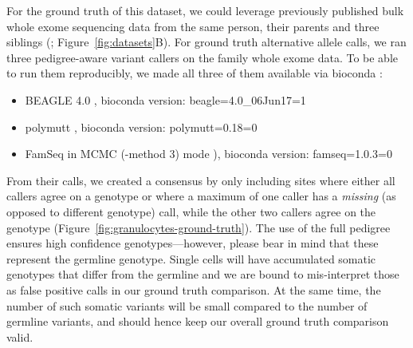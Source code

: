 \documentclass[authoryear,preprint,11pt]{scrartcl}
\begin{document}
For the ground truth of this dataset, we could leverage previously published bulk whole exome sequencing data from the same person, their parents and three siblings (\cite{hoell_constitutional_2014}; Figure~\ref{fig:datasets}B).
For ground truth alternative allele calls, we ran three pedigree-aware variant callers on the family whole exome data.
To be able to run them reproducibly, we made all three of them available via bioconda \citep{gruning_bioconda:_2018}:
\begin{itemize}
  \item BEAGLE 4.0 \citep{browning_improving_2013}, bioconda version: {\ttfamily beagle=4.0\_06Jun17=1}
  \item polymutt \citep{li_likelihood-based_2012}, bioconda version: {\ttfamily polymutt=0.18=0}
  \item FamSeq in MCMC ({\ttfamily -method 3}) mode \citep{peng_rare_2013,peng_famseq:_2014}), bioconda version: {\ttfamily famseq=1.0.3=0}
\end{itemize}
From their calls, we created a consensus by only including sites where either all callers agree on a genotype or where a maximum of one caller has a \emph{missing} (as opposed to different genotype) call, while the other two callers agree on the genotype (Figure~\ref{fig:granulocytes-ground-truth}).
The use of the full pedigree ensures high confidence genotypes---however, please bear in mind that these represent the germline genotype.
Single cells will have accumulated somatic genotypes that differ from the germline and we are bound to mis-interpret those as false positive calls in our ground truth comparison.
At the same time, the number of such somatic variants will be small compared to the number of germline variants, and should hence keep our overall ground truth comparison valid.\\
\end{document}
